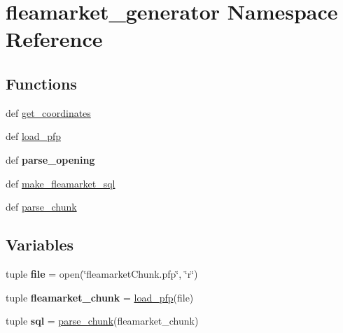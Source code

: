 \hypertarget{namespacefleamarket__generator}{\section{fleamarket\-\_\-generator Namespace Reference}
\label{namespacefleamarket__generator}
}
\subsection*{Functions}
\begin{DoxyCompactItemize}
\item 
def \hyperlink{namespacefleamarket__generator_a0bcc51456daf91e8bc04c5a8969ad21a}{get\-\_\-coordinates}
\item 
def \hyperlink{namespacefleamarket__generator_a130e9f8b2899bb5fa42adfb5fcc1231a}{load\-\_\-pfp}
\item 
\hypertarget{namespacefleamarket__generator_ae3543a5cf330fca1e83ca8cc772d0b54}{def {\bfseries parse\-\_\-opening}}\label{namespacefleamarket__generator_ae3543a5cf330fca1e83ca8cc772d0b54}

\item 
def \hyperlink{namespacefleamarket__generator_a81054b562415c2decf8d4c21ad42f1ad}{make\-\_\-fleamarket\-\_\-sql}
\item 
def \hyperlink{namespacefleamarket__generator_ab1981a1f1d6d772f2c2f2ae9cf6aacde}{parse\-\_\-chunk}
\end{DoxyCompactItemize}
\subsection*{Variables}
\begin{DoxyCompactItemize}
\item 
\hypertarget{namespacefleamarket__generator_a268c913fed291be5d6c7980909e8d34b}{tuple {\bfseries file} = open(\char`\"{}fleamarket\-Chunk.\-pfp\char`\"{}, \char`\"{}r\char`\"{})}\label{namespacefleamarket__generator_a268c913fed291be5d6c7980909e8d34b}

\item 
\hypertarget{namespacefleamarket__generator_aa41f33595ea7867a05d31e260315e8ce}{tuple {\bfseries fleamarket\-\_\-chunk} = \hyperlink{namespacefleamarket__generator_a130e9f8b2899bb5fa42adfb5fcc1231a}{load\-\_\-pfp}(file)}\label{namespacefleamarket__generator_aa41f33595ea7867a05d31e260315e8ce}

\item 
\hypertarget{namespacefleamarket__generator_a062ae1c4c243aa006721285156ddc93a}{tuple {\bfseries sql} = \hyperlink{namespacefleamarket__generator_ab1981a1f1d6d772f2c2f2ae9cf6aacde}{parse\-\_\-chunk}(fleamarket\-\_\-chunk)}\label{namespacefleamarket__generator_a062ae1c4c243aa006721285156ddc93a}

\end{DoxyCompactItemize}


